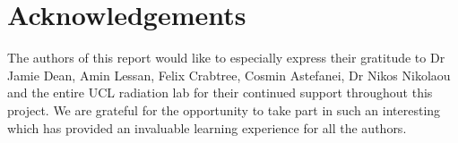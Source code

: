 \documentclass[NOTE, disdraft=true, UKenglish]{\DISCDTLATEXPATH UCLCDTDISdoc}
\begin{document}
\section{Acknowledgements}
The authors of this report would like to especially express their gratitude to Dr Jamie Dean, Amin Lessan, Felix Crabtree, Cosmin Astefanei, Dr Nikos Nikolaou and the entire UCL radiation lab for their continued support throughout this project. We are grateful for the opportunity to take part in such an interesting which has provided an invaluable learning experience for all the authors.


\printbibliography
%
\end{document}
